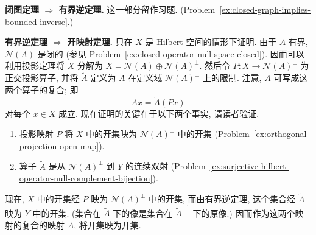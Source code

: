 \begin{Proof}
\textbf{闭图定理 $\Rightarrow$ 有界逆定理.} 这一部分留作习题. (Problem~\ref{ex:closed-graph-implies-bounded-inverse}.)

\textbf{有界逆定理 $\Rightarrow$ 开映射定理.} 只在 $X$ 是 Hilbert 空间的情形下证明. 由于 $A$ 有界, $\mathcal{N}(A)$ 是闭的 (参见 Problem~\ref{ex:closed-operator-null-space-closed}). 因而可以利用投影定理将 $X$ 分解为 $X=\mathcal{N}(A)\oplus\mathcal{N}(A)^\perp$. 然后令 $P:X\to\mathcal{N}(A)^\perp$ 为正交投影算子, 并将 $\widetilde A$ 定义为 $A$ 在定义域 $\mathcal{N}(A)^\perp$ 上的限制. 注意, $A$ 可写成这两个算子的复合; 即\[Ax=\widetilde A(Px)\]对每个 $x\in X$ 成立. 现在证明的关键在于以下两个事实, 请读者验证.\begin{enumerate}\item 投影映射 $P$ 将 $X$ 中的开集映为 $\mathcal{N}(A)^\perp$ 中的开集 (Problem~\ref{ex:orthogonal-projection-open-map}).\item 算子 $\widetilde A$ 是从 $\mathcal{N}(A)^\perp$ 到 $Y$ 的连续双射 (Problem~\ref{ex:surjective-hilbert-operator-null-complement-bijection}).\end{enumerate}现在, $X$ 中的开集经 $P$ 映为 $\mathcal{N}(A)^\perp$ 中的开集, 而由有界逆定理, 这个集合经 $\widetilde A$ 映为 $Y$ 中的开集. (集合在 $\widetilde A$ 下的像是集合在 $\widetilde A^{-1}$ 下的原像.) 因而作为这两个映射的复合的映射 $A$, 将开集映为开集.
\end{Proof}
\endgroup
